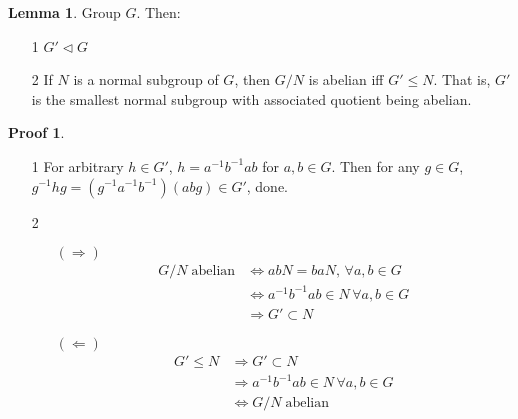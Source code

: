 \documentclass{book}
\theoremstyle{definition}
\newtheorem{lemma}{Lemma}[chapter]
\theoremstyle{remarkstyle}
\newtheorem*{myproof}{Proof}%
\begin{document}
\begin{lemma}
    Group $G$. Then:
    \begin{itemize}
        \item[1] $G' \triangleleft G $
        \item[2] If $N$ is a normal subgroup of $G$, then $G/N$ is abelian iff $G'\le N$. That is, $G'$ is the smallest normal subgroup with associated quotient being abelian.
    \end{itemize}
\end{lemma}
\begin{myproof}
    \begin{itemize}
        \item[]
        \item[1] For arbitrary $h \in G'$, $h=a^{-1}b^{-1}ab $ for $a,b\in G$. Then for any $g \in G$, $g^{-1}hg = (g^{-1}a^{-1}b^{-1})(abg) \in G' $, done.
        \item[2] 
        \begin{itemize}
            \item[$(\Rightarrow)$]
            \begin{align*}
                 G/N \; \textrm{abelian}
                &\Leftrightarrow abN = baN, \, \forall a,b\in G \\
                &\Leftrightarrow a^{-1}b^{-1}ab \in N \, \forall a,b\in G \\
                &\Rightarrow G' \subset N
            \end{align*}
            \item[$(\Leftarrow)$]
            \begin{align*}
                 G'\le N 
                &\Rightarrow G' \subset N \\
                &\Rightarrow a^{-1}b^{-1}ab \in N \, \forall a,b\in G \\
                &\Leftrightarrow G/N \; \textrm{abelian}
            \end{align*}
            \item[] 
        \end{itemize} 
    \end{itemize}
\end{myproof}
\end{document}
